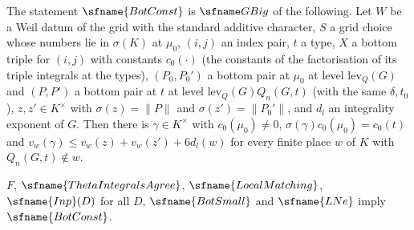 The statement $\sfname{BotConst}$ is $\fitGBig$ of the following. Let $W$ be a Weil datum of the grid with the standard
additive character, $S$ a grid choice whose numbers lie in $\sigma(K)$ at $\mu_0$, $(i,j)$ an index pair, $t$ a type, $X$ a
bottom triple for $(i,j)$ with constants $c_0(\cdot)$ (the constants of the factorisation of its triple integrals at the types),
$(P_0,P_0')$ a bottom pair at $\mu_0$ at level $\mathrm{lev}_Q(G)$ and $(P,P')$ a bottom pair at $t$ at level
$\mathrm{lev}_Q(G)Q_n(G,t)$ (with the same $\delta,t_0$), $z,z'\in K^\times$ with $\sigma(z)=\|P\|$ and $\sigma(z')=\|P_0'\|$,
and $d_l$ an integrality exponent of $G$. Then there is $\gamma\in K^\times$ with $c_0(\mu_0)\ne0$,
$\sigma(\gamma)c_0(\mu_0)=c_0(t)$ and $v_w(\gamma)\le v_w(z)+v_w(z')+6d_l(w)$ for every finite place $w$ of $K$ with
$Q_n(G,t)\notin w$.

\begin{theorem}\label{pf:fit:botconst}
$F$, $\sfname{ThetaIntegralsAgree}$, $\sfname{LocalMatching}$, $\sfname{Inp}(D)$ for all $D$, $\sfname{BotSmall}$ and
$\sfname{LNe}$ imply $\sfname{BotConst}$.
\end{theorem}

